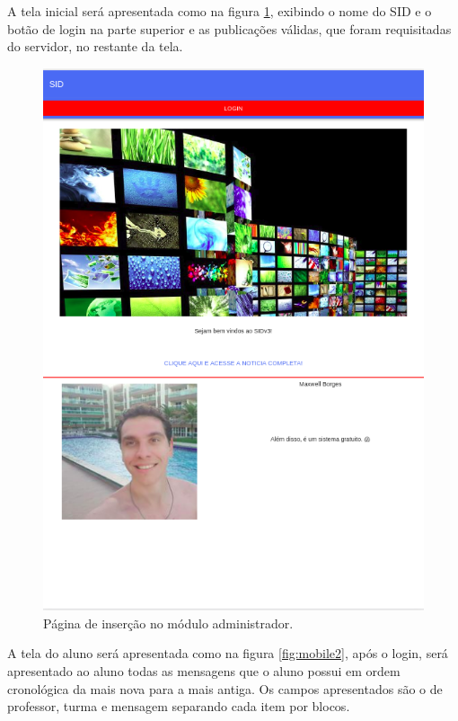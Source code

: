 A tela inicial será apresentada como na figura \ref{fig:mobile1}, exibindo o nome do SID e o botão de login na parte superior e as publicações válidas, que foram requisitadas do servidor, no restante da tela.
\begin{figure}[H]
\centering
\includegraphics[scale=0.45]{figuras/mobile1}
\caption{Página de inserção no módulo administrador.}
\label{fig:mobile1}
\end{figure}

A tela do aluno será apresentada como na figura \ref{fig:mobile2}, após o login, será apresentado ao aluno todas as mensagens que o aluno possui em ordem cronológica da mais nova para a mais antiga. Os campos apresentados são o de professor, turma e mensagem separando cada item por blocos.

